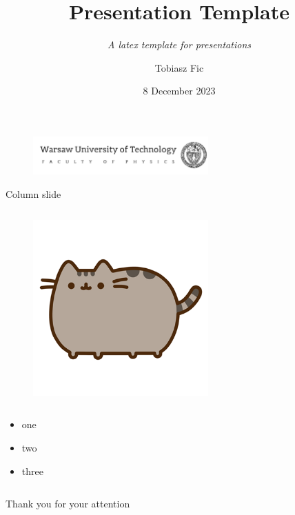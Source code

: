 

\title{Presentation Template}
    \subtitle{\textit{A latex template for presentations}}
\author{Tobiasz Fic}
\date{8 December 2023}



\begin{frame}
    \maketitle
    \begin{figure}
        \centering
        \includegraphics[width=0.6\textwidth]{images/logo_eng.png}
    \end{figure}
\end{frame}

\begin{columnframe}{Column slide}
    \begin{column}{0.5\textwidth}
        \begin{figure}
            \centering
            \includegraphics[width=0.6\textwidth]{images/pusheen.png}
        \end{figure}
    \end{column}
    \begin{column}{0.5\textwidth}
        \begin{itemize}
            \item one
            \item two
            \item three
        \end{itemize}
    \end{column}
\end{columnframe}

\begin{frame}{}
    \centering
    \Large{Thank you for your attention}
\end{frame}

